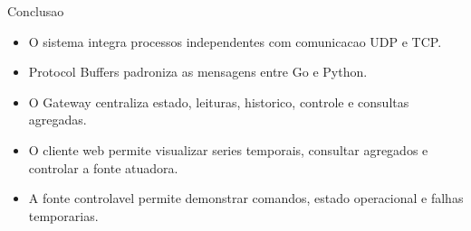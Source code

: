 \documentclass[aspectratio=169]{beamer}
\begin{document}
\begin{frame}{Conclusao}
  \begin{itemize}
    \item O sistema integra processos independentes com comunicacao UDP e TCP.
    \item Protocol Buffers padroniza as mensagens entre Go e Python.
    \item O Gateway centraliza estado, leituras, historico, controle e consultas agregadas.
    \item O cliente web permite visualizar series temporais, consultar agregados e controlar a fonte atuadora.
    \item A fonte controlavel permite demonstrar comandos, estado operacional e falhas temporarias.
  \end{itemize}
\end{frame}
\end{document}
